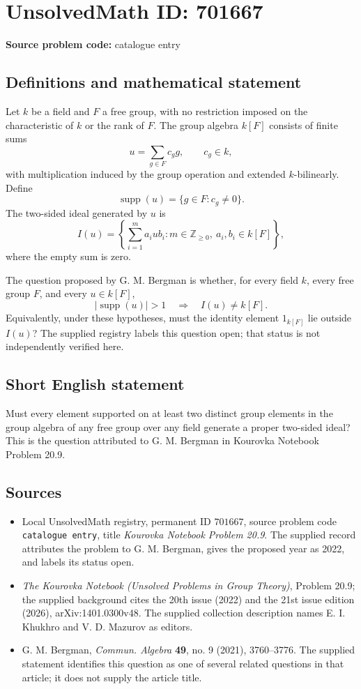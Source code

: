 \documentclass[11pt]{article}
\newcommand{\Z}{\mathbb{Z}}
\begin{document}
\section*{UnsolvedMath ID: 701667}
\textbf{Source problem code:} catalogue entry
\subsection{Definitions and mathematical statement}
Let \(k\) be a field and \(F\) a free group, with no restriction imposed on the characteristic of \(k\) or the rank of \(F\). The group algebra \(k[F]\) consists of finite sums
\[
u=\sum_{g\in F}c_g g,\qquad c_g\in k,
\]
with multiplication induced by the group operation and extended \(k\)-bilinearly. Define
\[
\operatorname{supp}(u)=\{g\in F:c_g\ne0\}.
\]
The two-sided ideal generated by \(u\) is
\[
I(u)=\left\{\sum_{i=1}^{m}a_iub_i:m\in\Z_{\ge0},\ a_i,b_i\in k[F]\right\},
\]
where the empty sum is zero.

The question proposed by G. M. Bergman is whether, for every field \(k\), every free group \(F\), and every \(u\in k[F]\),
\[
|\operatorname{supp}(u)|>1
\quad\Longrightarrow\quad
I(u)\ne k[F].
\]
Equivalently, under these hypotheses, must the identity element \(1_{k[F]}\) lie outside \(I(u)\)? The supplied registry labels this question open; that status is not independently verified here.
\subsection{Short English statement}
Must every element supported on at least two distinct group elements in the group algebra of any free group over any field generate a proper two-sided ideal? This is the question attributed to G. M. Bergman in Kourovka Notebook Problem 20.9.
\subsection{Sources}
\begin{itemize}
\item Local UnsolvedMath registry, permanent ID \(701667\), source problem code \texttt{catalogue entry}, title \emph{Kourovka Notebook Problem 20.9}. The supplied record attributes the problem to G. M. Bergman, gives the proposed year as 2022, and labels its status open.
\item \emph{The Kourovka Notebook (Unsolved Problems in Group Theory)}, Problem 20.9; the supplied background cites the 20th issue (2022) and the 21st issue edition (2026), arXiv:1401.0300v48. The supplied collection description names E. I. Khukhro and V. D. Mazurov as editors.
\item G. M. Bergman, \emph{Commun. Algebra} \textbf{49}, no. 9 (2021), 3760--3776. The supplied statement identifies this question as one of several related questions in that article; it does not supply the article title.
\end{itemize}
\end{document}
